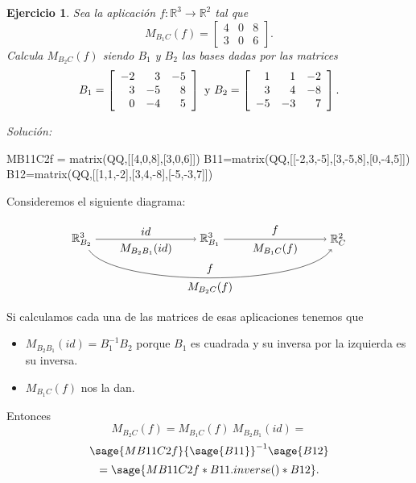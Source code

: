 \documentclass{amsart}
\newtheorem{ejer}{Ejercicio}
\def\r{\mathbb{R}}
\begin{document}
\begin{ejer} 
Sea la aplicación $f: \r ^3\to \r ^2$ tal que 
\[ M_{B_1C}(f) = \left[ \begin{array}{rrr} 4 & 0 & 8 \\  
3 & 0 & 6 \end{array} \right]. \] Calcula $M_{B_2C}(f)$ 
siendo $B_1$ y $B_2$ las bases dadas por las matrices 
\[ B_1 = \left[ \begin{array}{rrr} -2 & 3 & -5\\ 3 & -5 & 8\\ 0 & -4 & 5 
\end{array} \right] \ \hbox{y} \ B_2 = \left[ \begin{array}{rrr} 1 & 1 & -2\\ 
3 & 4 & -8\\ -5 & -3 & 7  \end{array} \right].  \]
\end{ejer}

{\it Soluci\'on:}

\begin{sageblock}
MB11C2f = matrix(QQ,[[4,0,8],[3,0,6]])
B11=matrix(QQ,[[-2,3,-5],[3,-5,8],[0,-4,5]])
B12=matrix(QQ,[[1,1,-2],[3,4,-8],[-5,-3,7]])
\end{sageblock}

Consideremos el siguiente diagrama:

$$
\begin{tikzpicture}[xscale = 2]
\node (RB2) at (0,0) {$\r^3_{B_2}$};
\node (RB1) at (2,0) {$\r^3_{B_1}$};
\node (RC)  at (4,0) {$\r^2_{C}$};
\draw[->] (RB2) to node [above] {$id$} 
                   node [below] {$M_{B_2B_1}(id)$} (RB1);
\draw[->] (RB1) to node [above] {$f$} 
                   node [below] {$M_{B_1C}(f)$} (RC); 
\draw[->] (RB2) .. controls (0.5,-1.5) and (3.5,-1.5) .. 
                node [above] {$f$}
                node [below] {$M_{B_2C}(f)$} (RC);
\end{tikzpicture}
$$

Si calculamos cada una de las matrices de esas aplicaciones tenemos que
\begin{itemize}
\item $M_{B_2B_1}(id) = B_1^{-1} B_2$ porque $B_1$ es cuadrada
y su inversa por la izquierda es su inversa.
\item $M_{B_1C}(f)$ nos la dan. 
\end{itemize}

Entonces 
\[ M_{B_2C}(f) = M_{B_1C}(f) \ M_{B_2B_1}(id) = \] 
\[   \sage{MB11C2f}{\sage{B11}}^{-1}\sage{B12} \] 
\[ = \sage{MB11C2f*B11.inverse()*B12}. \]
\end{document}
